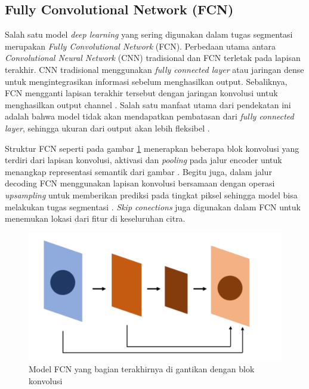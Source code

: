 \subsection{Fully Convolutional Network (FCN)}

Salah satu model \textit{deep learning} yang sering digunakan dalam tugas segmentasi merupakan \textit{Fully Convolutional Network }(FCN). Perbedaan utama antara \textit{Convolutional Neural Network} (CNN) tradisional dan FCN terletak pada lapisan terakhir. CNN tradisional menggunakan \textit{fully connected layer} atau jaringan dense untuk mengintegrasikan informasi sebelum menghasilkan output. Sebaliknya, FCN mengganti lapisan terakhir tersebut dengan jaringan konvolusi untuk menghasilkan output channel \cite{shlezinger_model-based_2023,huang_fully_2022}. Salah satu manfaat utama dari pendekatan ini adalah bahwa model tidak akan mendapatkan pembatasan dari \textit{fully connected layer}, sehingga ukuran dari output	 akan lebih fleksibel \cite{iqbal_analyses_2023}.


Struktur FCN seperti pada gambar \ref{fig:fcn} menerapkan beberapa blok konvolusi yang terdiri dari lapisan konvolusi, aktivasi dan \textit{pooling} pada jalur encoder untuk menangkap representasi semantik dari gambar \cite{azad_medical_2022}. Begitu juga, dalam jalur decoding FCN menggunakan lapisan konvolusi bersamaan dengan operasi \textit{upsampling} untuk memberikan prediksi pada tingkat piksel sehingga model bisa melakukan tugas segmentasi \cite{deng_fcn_2023}. \textit{Skip conections} juga digunakan dalam FCN untuk menemukan lokasi dari fitur di keseluruhan citra. 

\begin{figure}[H]
	\centering
	\includegraphics[scale=.2]{gambar/gambar-fcn.png}
	\caption{Model FCN yang bagian terakhirnya di gantikan dengan blok konvolusi \cite{huang_fully_2022}}
	\label{fig:fcn}
\end{figure}


